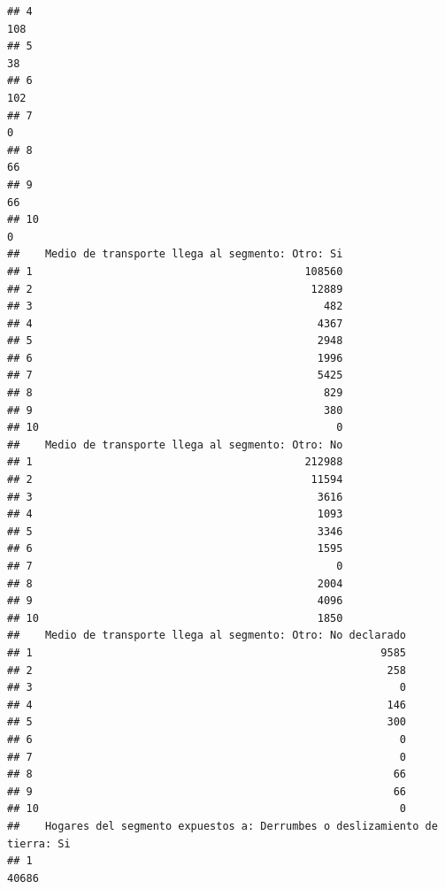 \documentclass[11pt,]{article}
\begin{document}
\begin{verbatim}
## 4                                                                       108
## 5                                                                        38
## 6                                                                       102
## 7                                                                         0
## 8                                                                        66
## 9                                                                        66
## 10                                                                        0
##    Medio de transporte llega al segmento: Otro: Si
## 1                                           108560
## 2                                            12889
## 3                                              482
## 4                                             4367
## 5                                             2948
## 6                                             1996
## 7                                             5425
## 8                                              829
## 9                                              380
## 10                                               0
##    Medio de transporte llega al segmento: Otro: No
## 1                                           212988
## 2                                            11594
## 3                                             3616
## 4                                             1093
## 5                                             3346
## 6                                             1595
## 7                                                0
## 8                                             2004
## 9                                             4096
## 10                                            1850
##    Medio de transporte llega al segmento: Otro: No declarado
## 1                                                       9585
## 2                                                        258
## 3                                                          0
## 4                                                        146
## 5                                                        300
## 6                                                          0
## 7                                                          0
## 8                                                         66
## 9                                                         66
## 10                                                         0
##    Hogares del segmento expuestos a: Derrumbes o deslizamiento de tierra: Si
## 1                                                                      40686

\end{verbatim}
\end{document}
